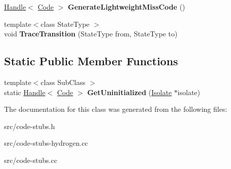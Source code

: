 \begin{DoxyCompactItemize}
\item 
\hypertarget{classv8_1_1internal_1_1_hydrogen_code_stub_a7018eb2c2ee29a4b5d2fdb67f80c65ff}{}\hyperlink{classv8_1_1internal_1_1_handle}{Handle}$<$ \hyperlink{classv8_1_1internal_1_1_code}{Code} $>$ {\bfseries Generate\+Lightweight\+Miss\+Code} ()\label{classv8_1_1internal_1_1_hydrogen_code_stub_a7018eb2c2ee29a4b5d2fdb67f80c65ff}

\item 
\hypertarget{classv8_1_1internal_1_1_hydrogen_code_stub_a3199a1593f7b097e096f2385b78b880e}{}{\footnotesize template$<$class State\+Type $>$ }\\void {\bfseries Trace\+Transition} (State\+Type from, State\+Type to)\label{classv8_1_1internal_1_1_hydrogen_code_stub_a3199a1593f7b097e096f2385b78b880e}

\end{DoxyCompactItemize}
\subsection*{Static Public Member Functions}
\begin{DoxyCompactItemize}
\item 
\hypertarget{classv8_1_1internal_1_1_hydrogen_code_stub_a03b41c5319d52cdac110d71007ee7c30}{}{\footnotesize template$<$class Sub\+Class $>$ }\\static \hyperlink{classv8_1_1internal_1_1_handle}{Handle}$<$ \hyperlink{classv8_1_1internal_1_1_code}{Code} $>$ {\bfseries Get\+Uninitialized} (\hyperlink{classv8_1_1internal_1_1_isolate}{Isolate} $\ast$isolate)\label{classv8_1_1internal_1_1_hydrogen_code_stub_a03b41c5319d52cdac110d71007ee7c30}

\end{DoxyCompactItemize}


The documentation for this class was generated from the following files\+:\begin{DoxyCompactItemize}
\item 
src/code-\/stubs.\+h\item 
src/code-\/stubs-\/hydrogen.\+cc\item 
src/code-\/stubs.\+cc\end{DoxyCompactItemize}
